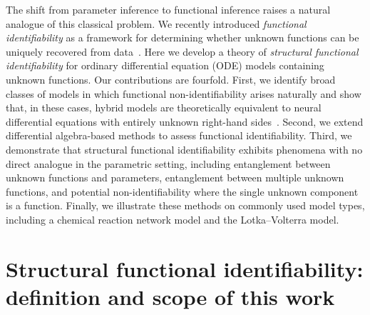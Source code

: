 \documentclass{article}
\theoremstyle{plain}
\theoremstyle{definition}
\begin{document}
The shift from parameter inference to functional inference raises a natural analogue of this classical problem. We recently introduced \emph{functional identifiability} as a framework for determining whether unknown functions can be uniquely recovered from data~\cite{loman_functional_2025}. Here we develop a theory of \emph{structural functional identifiability} for ordinary differential equation (ODE) models containing unknown functions. Our contributions are fourfold. First, we identify broad classes of models in which functional non-identifiability arises naturally and show that, in these cases, hybrid models are theoretically equivalent to neural differential equations with entirely unknown right-hand sides~\cite{chen_neural_2019,kidger_neural_2020}. Second, we extend differential algebra-based methods to assess functional identifiability. Third, we demonstrate that structural functional identifiability exhibits phenomena with no direct analogue in the parametric setting, including entanglement between unknown functions and parameters, entanglement between multiple unknown functions, and potential non-identifiability where the single unknown component is a function. Finally, we illustrate these methods on commonly used model types, including a chemical reaction network model and the Lotka--Volterra model.


\section{Structural functional identifiability: definition and scope of this work} \label{sec:functional_identifiability_definition}
\end{document}
